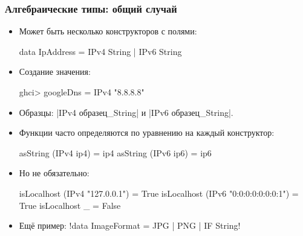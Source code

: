 \documentclass[10pt]{beamer}
\begin{document}
\begin{frame}[fragile]
  \frametitle{Алгебраические типы: общий случай}
  \begin{itemize}
    \item Может быть несколько конструкторов с полями:
          \begin{haskell}
            data IpAddress = IPv4 String | IPv6 String
          \end{haskell}
    \item Создание значения:
          \begin{haskell}
ghci> googleDns = IPv4 "8.8.8.8"
\end{haskell}
    \item Образцы: \haskinline|IPv4 образец_String| и \haskinline|IPv6 образец_String|.
    \item Функции часто определяются по уравнению на каждый конструктор:
          \begin{haskell}
            asString (IPv4 ip4) = ip4
            asString (IPv6 ip6) = ip6
          \end{haskell}
          \pause
    \item Но не обязательно:
          \begin{haskell}
            isLocalhost (IPv4 "127.0.0.1") = True
            isLocalhost (IPv6 "0:0:0:0:0:0:0:1") = True
            isLocalhost _ = False
          \end{haskell}
          \pause
    \item Ещё пример: \haskinline!data ImageFormat = JPG | PNG | IF String!
  \end{itemize}
\end{frame}
\end{document}
